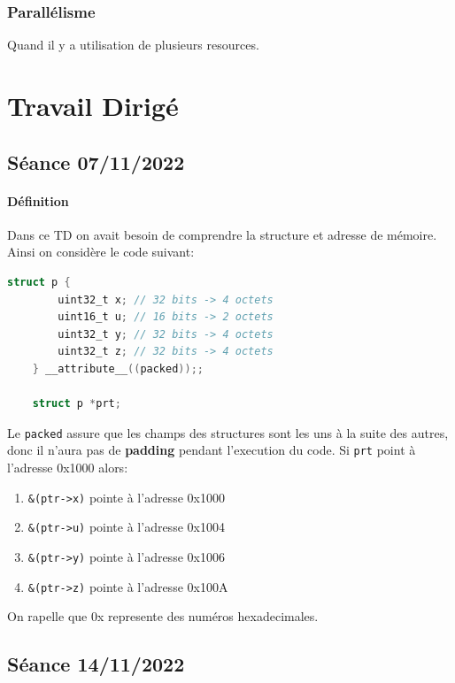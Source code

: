 \documentclass{article}
\begin{document}
\subsubsection{Parallélisme}
\begin{definition}\label{def:parallelisme}
    Quand il y a utilisation de plusieurs resources.
\end{definition}


\section{Travail Dirigé}
\subsection{Séance 07/11/2022}
\paragraph{Définition}Dans ce TD on avait besoin de comprendre la structure et adresse de mémoire. Ainsi on considère le code suivant:
\begin{scriptsize}\mycode
    \begin{lstlisting}[language=C]
    struct p {
        uint32_t x; // 32 bits -> 4 octets
        uint16_t u; // 16 bits -> 2 octets
        uint32_t y; // 32 bits -> 4 octets
        uint32_t z; // 32 bits -> 4 octets
    } __attribute__((packed));;

    struct p *prt;
    \end{lstlisting}
\end{scriptsize}
Le \texttt{packed} assure que les champs des structures sont les uns à la suite des autres, donc il n'aura pas de \textbf{padding} pendant l'execution du code. Si \texttt{prt} point à l'adresse 0x1000 alors:
\begin{enumerate}[noitemsep]
    \item \texttt{\&(ptr->x)} pointe à l'adresse 0x1000
    \item \texttt{\&(ptr->u)} pointe à l'adresse 0x1004
    \item \texttt{\&(ptr->y)} pointe à l'adresse 0x1006
    \item \texttt{\&(ptr->z)} pointe à l'adresse 0x100A
\end{enumerate}
On rapelle que 0x represente des numéros hexadecimales.

\newpage\subsection{Séance 14/11/2022}
\end{document}
